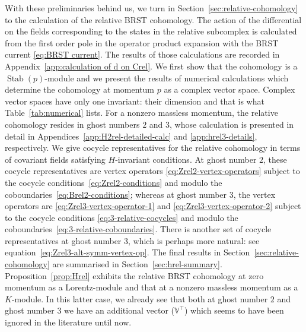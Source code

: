 \documentclass[11pt,reqno,a4paper,final]{amsart}
\theoremstyle{plain}
\theoremstyle{definition}
\newcommand{\Stab}{\operatorname{Stab}}
\newcommand{\VV}{\mathbb{V}}
\newcommand{\1}{\mathbb{1}}
\numberwithin{equation}{section}
\begin{document}
With these preliminaries behind us, we turn in
Section~\ref{sec:relative-cohomology} to the calculation of the
relative BRST cohomology.  The action of the differential on the
fields corresponding to the states in the relative subcomplex is
calculated from the first order pole in the operator product expansion
with the BRST current \eqref{eq:BRST current}.  The results of those
calculations are recorded in Appendix~\ref{app:calculation of d on
  Crel}. We first show that the cohomology is a $\Stab(p)$-module and
we present the results of numerical calculations which determine the
cohomology at momentum $p$ as a complex vector space. Complex vector
spaces have only one invariant: their dimension and that is what
Table~\ref{tab:numerical} lists. For a nonzero massless momentum, the
relative cohomology resides in ghost numbers $2$ and $3$, whose
calculation is presented in detail in
Appendices~\ref{app:H2rel-detailed-calc} and \ref{app:hrel3-details},
respectively. We give cocycle representatives for the relative
cohomology in terms of covariant fields satisfying $H$-invariant
conditions. At ghost number $2$, these cocycle representatives are
vertex operators \eqref{eq:Zrel2-vertex-operators} subject to the
cocycle conditions~\eqref{eq:Zrel2-conditions} and modulo the
coboundaries~\eqref{eq:Brel2-conditions}; whereas at ghost number $3$,
the vertex operators are \eqref{eq:Zrel3-vertex-operator-1} and
\eqref{eq:Zrel3-vertex-operator-2} subject to the cocycle conditions
\eqref{eq:3-relative-cocycles} and modulo the
coboundaries~\eqref{eq:3-relative-coboundaries}. There is another set
of cocycle representatives at ghost number $3$, which is perhaps more
natural: see equation~\eqref{eq:Zrel3-alt-symm-vertex-op}. The final
results in Section~\ref{sec:relative-cohomology} are summarised in
Section~\ref{sec:hrel-summary}. Proposition~\ref{prop:Hrel} exhibits
the relative BRST cohomology at zero momentum as a Lorentz-module and
that at a nonzero massless momentum as a $K$-module. In this latter
case, we already see that both at ghost number $2$ and ghost number
$3$ we have an additional vector ($\VV^\top$) which seems to have been
ignored in the literature until now.
\end{document}
